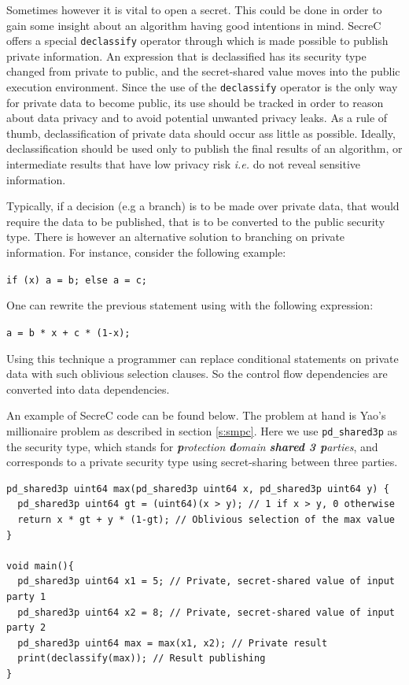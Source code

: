 Sometimes however it is vital to open a secret.
This could be done in order to gain some insight about an algorithm having good intentions in mind.
SecreC offers a special \texttt{declassify} operator through which is made possible to publish private information.
An expression that is  declassified has its security type changed from private to public, and the secret\hyp shared value moves into the public execution environment.
Since the use of the \texttt{declassify} operator is the only way for private data to become public, its use should be tracked in order to reason about data privacy and to avoid potential unwanted privacy leaks.
As a rule of thumb, declassification of private data should occur ass little as possible.
Ideally, declassification should be used only to publish the final results of an algorithm, or intermediate results that have low privacy risk \textit{i.e.} do not reveal sensitive information.

Typically, if a decision (e.g a branch) is to be made over private data, that would require the data to be published, that is to be converted to the public security type.
There is however an alternative solution to branching on private information.
For instance, consider the following example:

\texttt{if (x) a = b; else a = c; }

One can rewrite the previous statement using with the following expression:

\texttt{a = b * x + c * (1-x); }

Using this technique a programmer can replace conditional statements on private data with such oblivious selection clauses.
So the control flow dependencies are converted into data dependencies.

An example of SecreC code can be found below.
The problem at hand is Yao's millionaire problem \cite{yao1982protocols} as described in section \ref{s:smpc}.
Here we use \texttt{pd\_shared3p} as the security type, which stands for \textit{\textbf{p}rotection \textbf{d}omain \textbf{shared 3 p}arties}, and corresponds to a private security type using secret\hyp sharing between three parties.

{
\begin{verbatim}
pd_shared3p uint64 max(pd_shared3p uint64 x, pd_shared3p uint64 y) {
  pd_shared3p uint64 gt = (uint64)(x > y); // 1 if x > y, 0 otherwise
  return x * gt + y * (1-gt); // Oblivious selection of the max value
}

void main(){
  pd_shared3p uint64 x1 = 5; // Private, secret-shared value of input party 1
  pd_shared3p uint64 x2 = 8; // Private, secret-shared value of input party 2
  pd_shared3p uint64 max = max(x1, x2); // Private result
  print(declassify(max)); // Result publishing
}
\end{verbatim}
\label{l:millionaires}
}


